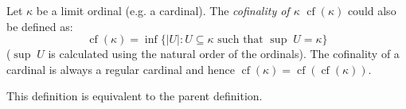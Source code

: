 \documentclass[12pt]{article}
\begin{document}
Let $\kappa$ be a limit ordinal (e.g. a cardinal). The {\em cofinality of $\kappa$} $\operatorname{cf}(\kappa)$ could also be defined as:
$$\operatorname{cf}(\kappa)=\inf \{ |U| : U \subseteq \kappa \text{ such that } \sup \; U = \kappa \} $$
($\sup \; U$ is calculated using the natural order of the ordinals). 
The cofinality of a cardinal is always a regular cardinal and hence $\operatorname{cf}(\kappa) = \operatorname{cf}(\operatorname{cf}(\kappa))$.  

This definition is equivalent to the parent definition.
\end{document}
